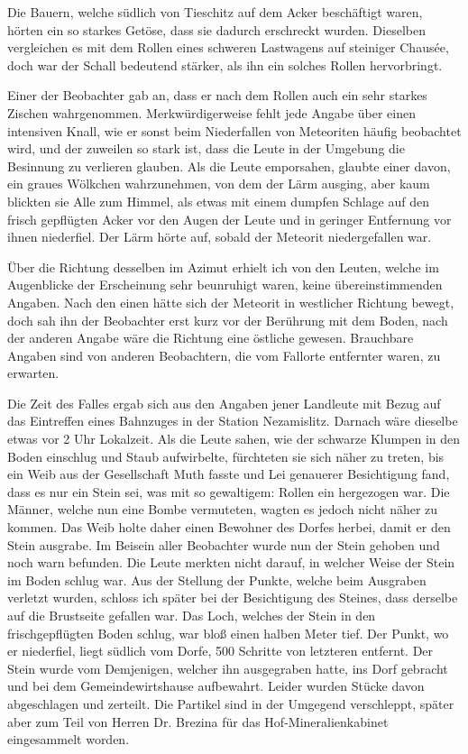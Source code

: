 \documentclass[a4paper, 11pt, oneside]{article}
\begin{document}
Die Bauern, welche südlich von Tieschitz auf dem Acker beschäftigt waren, hörten ein so starkes Getöse, dass sie dadurch erschreckt wurden. Dieselben vergleichen es mit dem Rollen eines schweren Lastwagens auf steiniger Chausée, doch war der Schall bedeutend stärker, als ihn ein solches Rollen hervorbringt.

Einer der Beobachter gab an, dass er nach dem Rollen auch ein sehr starkes Zischen wahrgenommen. Merkwürdigerweise fehlt jede Angabe über einen intensiven Knall, wie er sonst beim Niederfallen von Meteoriten häufig beobachtet wird, und der zuweilen so stark ist, dass die Leute in der Umgebung die Besinnung zu verlieren glauben. Als die Leute emporsahen, glaubte einer davon, ein graues Wölkchen wahrzunehmen, von dem der Lärm ausging, aber kaum blickten sie Alle zum Himmel, als etwas mit einem dumpfen Schlage auf den frisch gepflügten Acker vor den Augen der Leute und in geringer Entfernung vor ihnen niederfiel. Der Lärm hörte auf, sobald der Meteorit niedergefallen war.

Über die Richtung desselben im Azimut erhielt ich von den Leuten, welche im Augenblicke der Erscheinung sehr beunruhigt waren, keine übereinstimmenden Angaben. Nach den einen hätte sich der Meteorit in westlicher Richtung bewegt, doch sah ihn der Beobachter erst kurz vor der Berührung mit dem Boden, nach der anderen Angabe wäre die Richtung eine östliche gewesen. Brauchbare Angaben sind von anderen Beobachtern, die vom Fallorte entfernter waren, zu erwarten.

Die Zeit des Falles ergab sich aus den Angaben jener Landleute mit Bezug auf das Eintreffen eines Bahnzuges in der Station Nezamislitz. Darnach wäre dieselbe etwas vor 2 Uhr Lokalzeit. Als die Leute sahen, wie der schwarze Klumpen in den Boden einschlug und Staub aufwirbelte, fürchteten sie sich näher zu treten, bis ein Weib aus der Gesellschaft Muth fasste und Lei genauerer Besichtigung fand, dass es nur ein Stein sei, was mit so gewaltigem: Rollen ein hergezogen war. Die Männer, welche nun eine Bombe vermuteten, wagten es jedoch nicht näher zu kommen. Das Weib holte daher einen Bewohner des Dorfes herbei, damit er den Stein ausgrabe. Im Beisein aller Beobachter wurde nun der Stein gehoben und noch warn befunden. Die Leute merkten nicht darauf, in welcher Weise der Stein im Boden schlug war. Aus der Stellung der Punkte, welche beim Ausgraben verletzt wurden, schloss ich später bei der Besichtigung des Steines, dass derselbe auf die Brustseite gefallen war. Das Loch, welches der Stein in den frischgepflügten Boden schlug, war bloß einen halben Meter tief. Der Punkt, wo er niederfiel, liegt südlich vom Dorfe, 500 Schritte von letzteren entfernt. Der Stein wurde vom Demjenigen, welcher ihn ausgegraben hatte, ins Dorf gebracht und bei dem Gemeindewirtshause aufbewahrt. Leider wurden Stücke davon abgeschlagen und zerteilt. Die Partikel sind in der Umgegend verschleppt, später aber zum Teil von Herren Dr. Brezina für das Hof-Mineralienkabinet eingesammelt worden.
\end{document}

